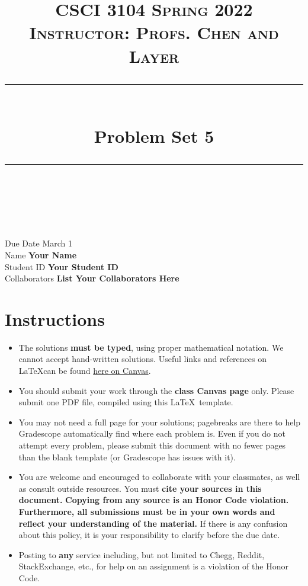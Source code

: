 \documentclass[11pt]{article}
\title{
\normalfont \normalsize 
\textsc{CSCI 3104 Spring 2022 \\ 
Instructor: Profs. Chen and Layer} \\
[10pt] 
\rule{\linewidth}{0.5pt} \\[6pt] 
\huge Problem Set 5 \\
\rule{\linewidth}{2pt}  \\[10pt]
}
\date{}
\theoremstyle{definition}
\theoremstyle{definition}
\theoremstyle{definition}
\begin{document}
\maketitle


\noindent
Due Date \dotfill March 1 \\
Name \dotfill \textbf{Your Name} \\
Student ID \dotfill \textbf{Your Student ID} \\
Collaborators \dotfill \textbf{List Your Collaborators Here}

\tableofcontents

\section*{Instructions}
 \begin{itemize}
	\item The solutions \textbf{must be typed}, using proper mathematical notation. We cannot accept hand-written solutions. Useful links and references on \LaTeX can be found \href{https://canvas.colorado.edu/courses/75824/pages/latex}{here on Canvas}.
	\item You should submit your work through the \textbf{class Canvas page} only. Please submit one PDF file, compiled using this \LaTeX \ template.
	\item You may not need a full page for your solutions; pagebreaks are there to help Gradescope automatically find where each problem is. Even if you do not attempt every problem, please submit this document with no fewer pages than the blank template (or Gradescope has issues with it).

	\item You are welcome and encouraged to collaborate with your classmates, as well as consult outside resources. You must \textbf{cite your sources in this document.} \textbf{Copying from any source is an Honor Code violation. Furthermore, all submissions must be in your own words and reflect your understanding of the material.} If there is any confusion about this policy, it is your responsibility to clarify before the due date. 

	\item Posting to \textbf{any} service including, but not limited to Chegg, Reddit, StackExchange, etc., for help on an assignment is a violation of the Honor Code.

\end{itemize}
\end{document}
